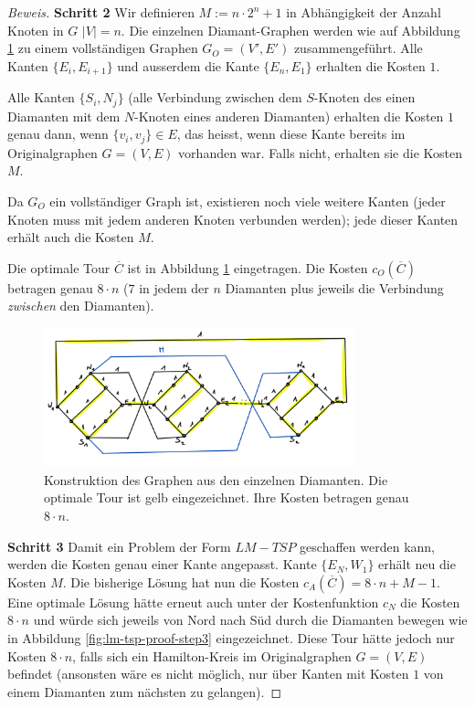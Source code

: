 \documentclass[a4paper,11pt]{scrreprt}
\begin{document}
\begin{proof}[Beweis]
\textbf{Schritt 2} Wir definieren $M := n \cdot 2^n + 1$ in Abhängigkeit der Anzahl Knoten in $G$ $|V| = n$. Die einzelnen Diamant-Graphen werden wie auf Abbildung \ref{fig:lm-tsp-proof-step2} zu einem vollständigen Graphen $G_O = (V', E')$ zusammengeführt. Alle Kanten $\{E_i, E_{i+1}\}$ und ausserdem die Kante $\{E_n, E_1\}$ erhalten die Kosten $1$. 

Alle Kanten $\{S_i, N_j\}$ (alle Verbindung zwischen dem $S$-Knoten des einen Diamanten mit dem $N$-Knoten eines anderen Diamanten) erhalten die Kosten $1$ genau dann, wenn $\{v_i, v_j\} \in E$, das heisst, wenn diese Kante bereits im Originalgraphen $G = (V, E)$ vorhanden war. Falls nicht, erhalten sie die Kosten $M$. 

Da $G_O$ ein vollständiger Graph ist, existieren noch viele weitere Kanten (jeder Knoten muss mit jedem anderen Knoten verbunden werden); jede dieser Kanten erhält auch die Kosten $M$. 

Die optimale Tour $\overline{C}$ ist in Abbildung \ref{fig:lm-tsp-proof-step2} eingetragen. Die Kosten $c_O(\overline{C})$ betragen genau $8 \cdot n$ ($7$ in jedem der $n$ Diamanten plus jeweils die Verbindung \emph{zwischen} den Diamanten).

\begin{figure}[H]
\centering
\includegraphics[width=0.8\textwidth]{lm_tsp_hard_new1.png}
\caption{Konstruktion des Graphen aus den einzelnen Diamanten. Die optimale Tour ist gelb eingezeichnet. Ihre Kosten betragen genau $8 \cdot n$.}
\label{fig:lm-tsp-proof-step2}
\end{figure}

\textbf{Schritt 3} Damit ein Problem der Form $LM-TSP$ geschaffen werden kann, werden die Kosten genau einer Kante angepasst. Kante $\{E_N, W_1\}$ erhält neu die Kosten $M$. Die bisherige Lösung hat nun die Kosten $c_A(\overline{C}) = 8 \cdot n + M - 1$. Eine optimale Lösung hätte erneut auch unter der Kostenfunktion $c_N$ die Kosten $8 \cdot n$ und würde sich jeweils von Nord nach Süd durch die Diamanten bewegen wie in Abbildung \ref{fig:lm-tsp-proof-step3} eingezeichnet. Diese Tour hätte jedoch nur Kosten $8 \cdot n$, falls sich ein Hamilton-Kreis im Originalgraphen $G = (V, E)$ befindet (ansonsten wäre es nicht möglich, nur über Kanten mit Kosten $1$ von einem Diamanten zum nächsten zu gelangen).


\end{proof}
\end{document}
